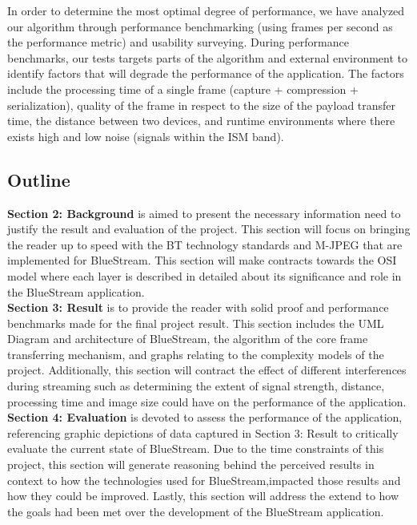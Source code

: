 \documentclass[a4paper,12pt]{article}
\begin{document}
In order to determine the most optimal degree of performance, we have analyzed our algorithm through performance benchmarking (using frames per second as the performance metric) and usability surveying. During performance benchmarks, our tests targets parts of the algorithm and external environment to identify factors that will degrade the performance of the application. The factors include the processing time of a single frame (capture + compression + serialization), quality of the frame in respect to the size of the payload transfer time, the distance between two devices, and runtime environments where there exists high and low noise (signals within the ISM band). 


\subsection{Outline}
\textbf{Section 2: Background} is aimed to present the necessary information need to justify the result and evaluation of the project. This section will focus on bringing the reader up to speed with the BT technology standards and M-JPEG that are implemented for BlueStream. This section will make contracts towards the OSI model where each layer is described in detailed about its significance and role in the BlueStream application. \\

\noindent\textbf{Section 3: Result} is to provide the reader with solid proof and performance benchmarks made for the final project result. This section includes the UML Diagram and architecture of BlueStream, the algorithm of the core frame transferring mechanism, and graphs relating to the complexity models of the project. Additionally, this section will contract the effect of different interferences during streaming such as determining the extent of signal strength, distance, processing time and image size could have on the performance of the application.\\

\noindent\textbf{Section 4: Evaluation} is devoted to assess the performance of the application, referencing graphic depictions of data captured in Section 3: Result to critically evaluate the current state of BlueStream. Due to the time constraints of this project, this section will generate reasoning behind the perceived results in context to how the technologies used for BlueStream,impacted those results and how they could be improved. Lastly, this section will address the extend to how the goals had been met over the development of the BlueStream application.  \\
\end{document}
